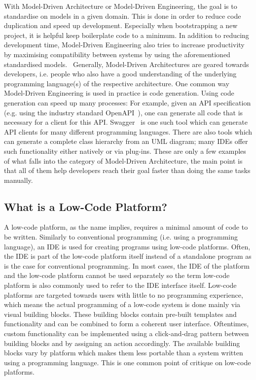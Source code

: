 \documentclass[runningheads]{llncs}
\begin{document}
With Model-Driven Architecture or Model-Driven Engineering, the goal is to standardise on models in a given domain. This is done in order to reduce code duplication and speed up development. Especially when bootstrapping a new project, it is helpful keep boilerplate code to a minimum. In addition to reducing development time, Model-Driven Engineering also tries to increase productivity by maximising compatibility between systems by using the aforementioned standardised models.~\cite{wiki:model_driven_engineering} Generally, Model-Driven Architectures are geared towards developers, i.e. people who also have a good understanding of the underlying programming language(s) of the respective architecture. One common way Model-Driven Engineering is used in practice is code generation. Using code generation can speed up many processes: For example, given an API specification (e.g. using the industry standard OpenAPI~\cite{openapis}), one can generate all code that is necessary for a client for this API. Swagger~\cite{swagger} is one such tool which can generate API clients for many different programming languages. There are also tools which can generate a complete class hierarchy from an UML diagram; many IDEs offer such functionality either natively or via plug-ins. These are only a few examples of what falls into the category of Model-Driven Architecture, the main point is that all of them help developers reach their goal faster than doing the same tasks manually.

\subsection{What is a Low-Code Platform?}
\label{ssec:what_is_a_low_code_platform}

A low-code platform, as the name implies, requires a minimal amount of code to be written. Similarly to conventional programming (i.e. using a programming language), an IDE is used for creating programs using low-code platforms. Often, the IDE is part of the low-code platform itself instead of a standalone program as is the case for conventional programming. In most cases, the IDE of the platform and the low-code platform cannot be used separately so the term low-code platform is also commonly used to refer to the IDE interface itself. Low-code platforms are targeted towards users with little to no programming experience, which means the actual programming of a low-code system is done mainly via visual building blocks. These building blocks contain pre-built templates and functionality and can be combined to form a coherent user interface. Oftentimes, custom functionality can be implemented using a click-and-drag pattern between building blocks and by assigning an action accordingly. The available building blocks vary by platform which makes them less portable than a system written using a programming language. This is one common point of critique on low-code platforms.
\end{document}
